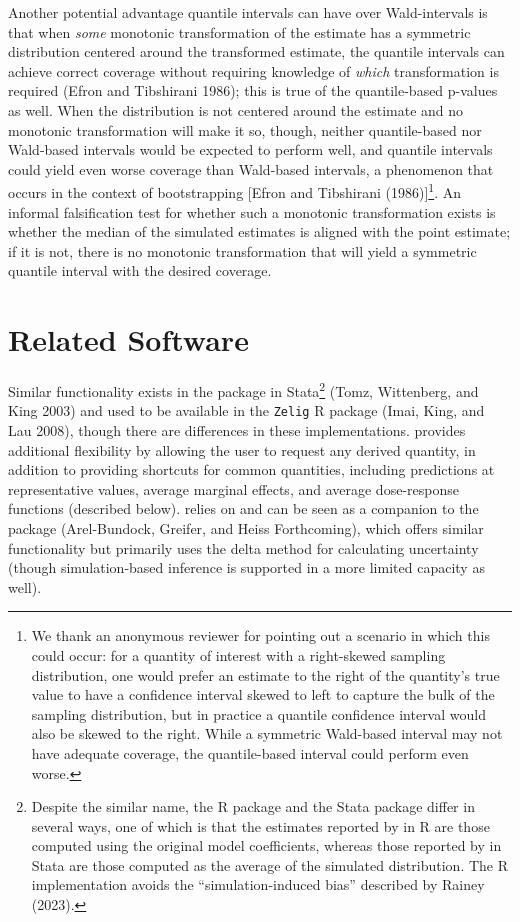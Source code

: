 Another potential advantage quantile intervals can have over Wald-intervals is that when \emph{some} monotonic transformation of the estimate has a symmetric distribution centered around the transformed estimate, the quantile intervals can achieve correct coverage without requiring knowledge of \emph{which} transformation is required (Efron and Tibshirani 1986); this is true of the quantile-based p-values as well. When the distribution is not centered around the estimate and no monotonic transformation will make it so, though, neither quantile-based nor Wald-based intervals would be expected to perform well, and quantile intervals could yield even worse coverage than Wald-based intervals, a phenomenon that occurs in the context of bootstrapping {[}Efron and Tibshirani (1986){]}\footnote{We thank an anonymous reviewer for pointing out a scenario in which this could occur: for a quantity of interest with a right-skewed sampling distribution, one would prefer an estimate to the right of the quantity's true value to have a confidence interval skewed to left to capture the bulk of the sampling distribution, but in practice a quantile confidence interval would also be skewed to the right. While a symmetric Wald-based interval may not have adequate coverage, the quantile-based interval could perform even worse.}. An informal falsification test for whether such a monotonic transformation exists is whether the median of the simulated estimates is aligned with the point estimate; if it is not, there is no monotonic transformation that will yield a symmetric quantile interval with the desired coverage.

\hypertarget{related-software}{%
\section{Related Software}\label{related-software}}

Similar functionality exists in the  package in Stata\footnote{Despite the similar name, the R package  and the Stata package  differ in several ways, one of which is that the estimates reported by  in R are those computed using the original model coefficients, whereas those reported by  in Stata are those computed as the average of the simulated distribution. The R implementation avoids the ``simulation-induced bias'' described by Rainey (2023).} (Tomz, Wittenberg, and King 2003) and used to be available in the \texttt{Zelig} R package (Imai, King, and Lau 2008), though there are differences in these implementations.  provides additional flexibility by allowing the user to request any derived quantity, in addition to providing shortcuts for common quantities, including predictions at representative values, average marginal effects, and average dose-response functions (described below).  relies on and can be seen as a companion to the  package (Arel-Bundock, Greifer, and Heiss Forthcoming), which offers similar functionality but primarily uses the delta method for calculating uncertainty (though simulation-based inference is supported in a more limited capacity as well).

